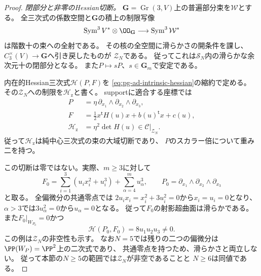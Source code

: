 \begin{proof}
\emph{閉部分と非零のHessian切断。}
$\mathbf G=\operatorname{Gr}(3,V)$上の普遍部分束を$\mathcal W$とする。
全三次式の係数空間と$\mathbf G$の積上の制限写像
\begin{equation}
 \operatorname{Sym}^3V^*\otimes\OO_{\mathbf G}
 \longrightarrow\operatorname{Sym}^3\mathcal W^*
 \label{eq:pg-intrinsic-zero-restriction-surjection}
\end{equation}
は階数十の束への全射である。
その核の全空間に滑らかさの開条件を課し、
$C_3^\times(V)\to\mathbf G$へ引き戻したものが
$\mathcal Z_N$である。
従ってこれは$\mathcal S_N$内の滑らかな余次元十の閉部分となる。
また$P\mapsto sP$、$s\in\mathbf G_m$で安定である。

内在的Hessian三次式$\mathscr H(P,F)$を
\eqref{eq:pg-ad-intrinsic-hessian}の縮約で定める。
その$\mathcal Z_N$への制限を$\mathscr H_{\mathrm z}$と書く。
supportに適合する座標では
\begin{equation}
 \begin{aligned}
 P&=\eta\,\partial_{x_1}\wedge\partial_{x_2}\wedge\partial_{x_3},\\
 F&=\tfrac12 x^{\mathsf t}H(u)x+b(u)^{\mathsf t}x+c(u),\\
 \mathscr H_{\mathrm z}&=\eta^2\det H(u)
       \in\mathcal C|_{\mathcal Z_N}.
 \end{aligned}
 \label{eq:pg-intrinsic-zero-hessian-pure-central}
\end{equation}
従って$\mathscr H_{\mathrm z}$は純中心三次式の束の大域切断であり、
$P$のスカラー倍について重み二を持つ。

この切断は零ではない。実際、$m\ge3$に対して
\begin{equation}
 F_0=\sum_{i=1}^3(u_ix_i^2+u_i^3)
          +\sum_{\alpha=4}^m u_\alpha^3,\qquad
 P_0=\partial_{x_1}\wedge\partial_{x_2}\wedge\partial_{x_3}
 \label{eq:pg-intrinsic-zero-obstruction-example}
\end{equation}
と取る。
全偏微分の共通零点では
$2u_ix_i=x_i^2+3u_i^2=0$から$x_i=u_i=0$となり、
$\alpha>3$では$3u_\alpha^2=0$から$u_\alpha=0$となる。
従って$F_0$の射影超曲面は滑らかである。
また$F_0|_{W_{P_0}}=0$かつ
\begin{equation}
 \mathscr H(P_0,F_0)=8u_1u_2u_3\ne0.
 \label{eq:pg-intrinsic-zero-nonzero-hessian}
\end{equation}
この例は$\mathcal Z_N$の非空性も示す。
なお$N=5$では残りの二つの偏微分は$\PP(W_P)=\PP^2$上の二次式であり、
共通零点を持つため、滑らかさと両立しない。
従って本節の$N\ge5$の範囲では$\mathcal Z_N$が非空であることと
$N\ge6$は同値である。


\end{proof}
